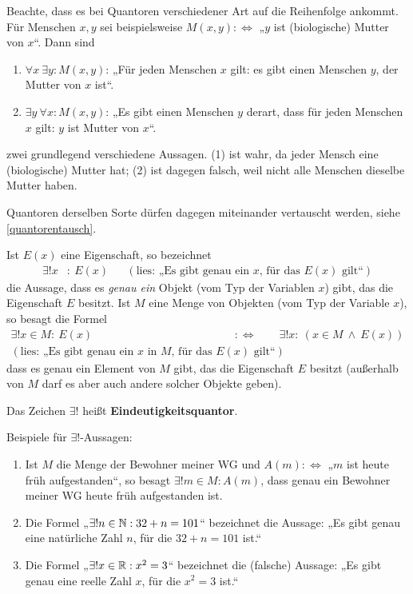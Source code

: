  
\begin{bem} \label{quantorreihenfolge}
    Beachte, dass es bei Quantoren verschiedener Art auf die Reihenfolge ankommt. Für Menschen $x,y$ sei beispielsweise $M(x,y):\Leftrightarrow$ „$y$ ist (biologische) Mutter von $x$“. Dann sind
    \begin{enumerate}[(1)]
        \item $\forall x\ \exists y: M(x,y)$: „Für jeden Menschen $x$ gilt: es gibt einen Menschen $y$, der Mutter von $x$ ist“.
        \item $\exists y\ \forall x: M(x,y)$: „Es gibt einen Menschen $y$ derart, dass für jeden Menschen $x$ gilt: $y$ ist Mutter von $x$“.
    \end{enumerate}
    zwei grundlegend verschiedene Aussagen. (1) ist wahr, da jeder Mensch eine (biologische) Mutter hat; (2) ist dagegen falsch, weil nicht alle Menschen dieselbe Mutter haben.
    
    Quantoren derselben Sorte dürfen dagegen miteinander vertauscht werden, siehe \cref{quantorentausch}.
\end{bem}


\begin{defin} \label{def:eindquant}
    Ist $E(x)$ eine Eigenschaft, so bezeichnet
    \begin{align*}
        \exists ! x& :\ E(x) && (\text{lies: „Es gibt genau ein $x$, für das $E(x)$ gilt“})
    \end{align*}
    die Aussage, dass es \emph{genau ein} Objekt (vom Typ der Variablen $x$) gibt, das die Eigenschaft $E$ besitzt. Ist $M$ eine Menge von Objekten (vom Typ der Variable $x$), so besagt die Formel
    \begin{align*}
        \exists ! x\in M :\ E(x) \qquad &:\Leftrightarrow\qquad \exists ! x:\ (x\in M\ \land\ E(x)) \\
        (\text{lies: „Es gibt genau ein $x$ in $M$, für das $E(x)$ gilt“})
    \end{align*}
    dass es genau ein Element von $M$ gibt, das die Eigenschaft $E$ besitzt (außerhalb von $M$ darf es aber auch andere solcher Objekte geben).
    
    Das Zeichen $\exists !$ heißt \textbf{Eindeutigkeitsquantor}.
\end{defin}


\begin{bsp}
    Beispiele für $\exists !$-Aussagen:
    \begin{enumerate}
        \item Ist $M$ die Menge der Bewohner meiner WG und $A(m):\Leftrightarrow$ „$m$ ist heute früh aufgestanden“, so besagt $\exists ! m\in M: A(m)$, dass genau ein Bewohner meiner WG heute früh aufgestanden ist.
        \item Die Formel „$\exists ! n\in \mathbb N : 32+n = 101$“ bezeichnet die Aussage: „Es gibt genau eine natürliche Zahl $n$, für die $32+n=101$ ist.“
        \item Die Formel „$\exists ! x\in \mathbb R: x^2=3$“ bezeichnet die (falsche) Aussage: „Es gibt genau eine reelle Zahl $x$, für die $x^2=3$ ist.“
    \end{enumerate}
\end{bsp}


